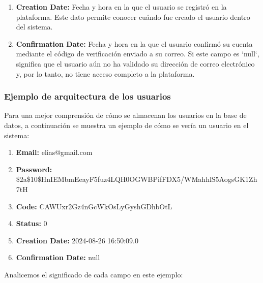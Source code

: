 \documentclass[draft]{scrbook}
\begin{document}
\begin{enumerate}
    \item \textbf{Creation Date:}  
    Fecha y hora en la que el usuario se registró en la plataforma. Este dato permite conocer cuándo fue creado el usuario dentro del sistema.

    \item \textbf{Confirmation Date:}  
    Fecha y hora en la que el usuario confirmó su cuenta mediante el código de verificación enviado a su correo. Si este campo es `null`, significa que el usuario aún no ha validado su dirección de correo electrónico y, por lo tanto, no tiene acceso completo a la plataforma.

\end{enumerate}

\subsubsection{Ejemplo de arquitectura de los usuarios}

Para una mejor comprensión de cómo se almacenan los usuarios en la base de datos, a continuación se muestra un ejemplo de cómo se vería un usuario en el sistema:

\begin{enumerate}
    \item \textbf{Email:} elias@gmail.com
    \item \textbf{Password:} \$2a\$10\$HnIEMbmEeayF5fuz4LQH0OGWBPifFDX5/WMahhlS5AogsGK1Zh7tH
    \item \textbf{Code:} CAWUxr2Gz4nGcWkOsLyGyshGDhbOtL
    \item \textbf{Status:} 0
    \item \textbf{Creation Date:} 2024-08-26 16:50:09.0
    \item \textbf{Confirmation Date:} null
\end{enumerate}

Analicemos el significado de cada campo en este ejemplo:
\end{document}
